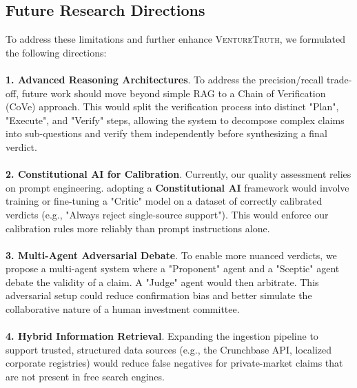 \subsection{Future Research Directions}
To address these limitations and further enhance \textsc{VentureTruth}, we formulated the following directions:
\\
\\
\textbf{1. Advanced Reasoning Architectures}. To address the precision/recall trade-off, future work should move beyond simple RAG to a Chain of Verification (CoVe) approach. This would split the verification process into distinct "Plan", "Execute", and "Verify" steps, allowing the system to decompose complex claims into sub-questions and verify them independently before synthesizing a final verdict.
\\
\\
\textbf{2. Constitutional AI for Calibration}. Currently, our quality assessment relies on prompt engineering. adopting a \textbf{Constitutional AI} framework would involve training or fine-tuning a "Critic" model on a dataset of correctly calibrated verdicts (e.g., "Always reject single-source support"). This would enforce our calibration rules more reliably than prompt instructions alone.
\\
\\
\textbf{3. Multi-Agent Adversarial Debate}. To enable more nuanced verdicts, we propose a multi-agent system where a "Proponent" agent and a "Sceptic" agent debate the validity of a claim. A "Judge" agent would then arbitrate. This adversarial setup could reduce confirmation bias and better simulate the collaborative nature of a human investment committee.
\\
\\
\textbf{4. Hybrid Information Retrieval}. Expanding the ingestion pipeline to support trusted, structured data sources (e.g., the Crunchbase API, localized corporate registries) would reduce false negatives for private-market claims that are not present in free search engines.

